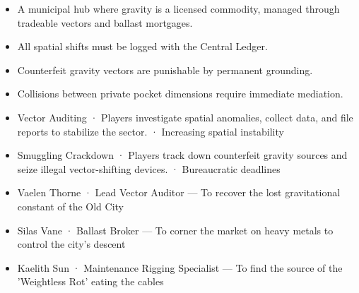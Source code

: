 \documentclass[10pt,a4paper]{article}
\newcommand{\heading}[1]{\par\vspace{5pt}{\color{teal}\bfseries #1}\par}
\begin{document}
\begin{minipage}[t]{0.48\linewidth}\fontsize{9}{12}\selectfont\raggedright\setlength{\parskip}{0pt}
\heading{世界概述}\begin{itemize}
\item A municipal hub where gravity is a licensed commodity, managed through tradeable vectors and ballast mortgages.
\end{itemize}
\heading{规则与制度}\begin{itemize}
\item All spatial shifts must be logged with the Central Ledger.
\item Counterfeit gravity vectors are punishable by permanent grounding.
\item Collisions between private pocket dimensions require immediate mediation.
\end{itemize}
\heading{活动与压力}\begin{itemize}
\item Vector Auditing · Players investigate spatial anomalies, collect data, and file reports to stabilize the sector. · Increasing spatial instability
\item Smuggling Crackdown · Players track down counterfeit gravity sources and seize illegal vector-shifting devices. · Bureaucratic deadlines
\end{itemize}
\heading{人物与目标}\begin{itemize}
\item Vaelen Thorne · Lead Vector Auditor — To recover the lost gravitational constant of the Old City
\item Silas Vane · Ballast Broker — To corner the market on heavy metals to control the city's descent
\item Kaelith Sun · Maintenance Rigging Specialist — To find the source of the 'Weightless Rot' eating the cables
\end{itemize}
\end{minipage}\hfill
\end{document}
